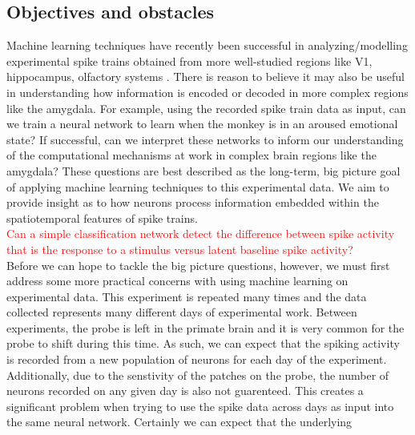 \documentclass[12pt]{article}
\begin{document}
\subsection{Objectives and obstacles}
Machine learning techniques have recently been successful in analyzing/modelling experimental spike trains obtained from more well-studied regions like V1, hippocampus, olfactory systems \cite{laza} \cite{banino} \cite{stevens}. There is reason to believe it may also be useful in understanding how information is encoded or decoded in more complex regions like the amygdala. For example, using the recorded spike train data as input, can we train a neural network to learn when the monkey is in an aroused emotional state? If successful, can we interpret these networks to inform our understanding of the computational mechanisms at work in complex brain regions like the amygdala?  These questions are best described as the long-term, big picture goal of applying machine learning techniques to this experimental data. We aim to provide insight as to how neurons process information embedded within the spatiotemporal features
of spike trains. \\
\indent \textcolor{red}{Can a simple classification network detect the difference between spike activity that is the response to a stimulus versus latent baseline spike activity?} \\
\indent Before we can hope to tackle the big picture questions, however, we must first address some more practical concerns with using machine learning on experimental data. This experiment is repeated many times and the data collected represents many different days of experimental work. Between experiments, the probe is left in the primate brain and it is very common for the probe to shift during this time. As such, we can expect that the spiking activity is recorded from a new population of neurons for each day of the experiment. Additionally, due to the senstivity of the patches on the probe, the number of neurons recorded on any given day is also not guarenteed. This creates a significant problem when trying to use the spike data across days as input into the same neural network. Certainly we can expect that the underlying
\end{document}
